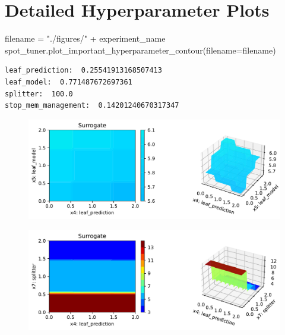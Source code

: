\documentclass[
  letterpaper,
  DIV=11,
  numbers=noendperiod]{scrreprt}
\newenvironment{Shaded}{\begin{snugshade}}{\end{snugshade}}
\newcommand{\NormalTok}[1]{\textcolor[rgb]{0.00,0.23,0.31}{#1}}
\newcommand{\OperatorTok}[1]{\textcolor[rgb]{0.37,0.37,0.37}{#1}}
\newcommand{\StringTok}[1]{\textcolor[rgb]{0.13,0.47,0.30}{#1}}
\begin{document}
\hypertarget{detailed-hyperparameter-plots-1}{%
\section{Detailed Hyperparameter
Plots}\label{detailed-hyperparameter-plots-1}}

\begin{Shaded}
\begin{Highlighting}[]
\NormalTok{filename }\OperatorTok{=} \StringTok{"./figures/"} \OperatorTok{+}\NormalTok{ experiment\_name}
\NormalTok{spot\_tuner.plot\_important\_hyperparameter\_contour(filename}\OperatorTok{=}\NormalTok{filename)}
\end{Highlighting}
\end{Shaded}

\begin{verbatim}
leaf_prediction:  0.25541913168507413
leaf_model:  0.771487672697361
splitter:  100.0
stop_mem_management:  0.14201240670317347
\end{verbatim}

\begin{figure}[H]

{\centering \includegraphics{13_spot_hpt_river_files/figure-pdf/cell-44-output-2.pdf}

}

\end{figure}

\begin{figure}[H]

{\centering \includegraphics{13_spot_hpt_river_files/figure-pdf/cell-44-output-3.pdf}

}

\end{figure}
\end{document}
